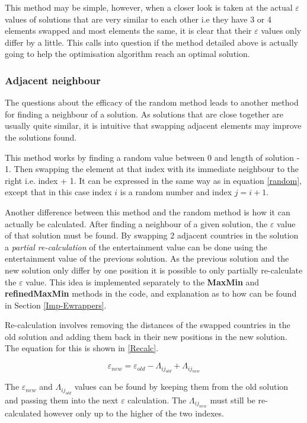 \documentclass[12pt]{report}
\begin{document}
This method may be simple, however, when a closer look is taken at the actual $\varepsilon$ values of solutions that are very similar to each other i.e they have 3 or 4 elements swapped and most elements the same, it is clear that their $\varepsilon$ values only differ by a little. This calls into question if the method detailed above is actually going to help the optimisation algorithm reach an optimal solution.

\subsubsection{Adjacent neighbour}
The questions about the efficacy of the random method leads to another method for finding a neighbour of a solution. As solutions that are close together are usually quite similar, it is intuitive that swapping adjacent elements may improve the solutions found.

This method works by finding a random value between 0 and length of solution - 1. Then swapping the element at that index with its immediate neighbour to the right i.e. index + 1. It can be expressed in the same way as in equation \ref{random}, except that in this case index $i$ is a random number and index $j = i + 1$.

Another difference between this method and the random method is how it can actually be calculated. After finding a neighbour of a given solution, the $\varepsilon$ value of that solution must be found. By swapping 2 adjacent countries in the solution a \textit{partial re-calculation} of the entertainment value can be done using the entertainment value of the previous solution. As the previous solution and the new solution only differ by one position it is possible to only partially re-calculate the $\varepsilon$ value. This idea is implemented separately to the \textbf{MaxMin} and \textbf{refinedMaxMin} methods in the code, and explanation as to how can be found in Section \ref{Imp-Ewrappers}.

Re-calculation involves removing the distances of the swapped countries in the old solution and adding them back in their new positions in the new solution. The equation for this is shown in \ref{Recalc}.

\begin{equation}\label{Recalc}
	\varepsilon_{new} = \varepsilon_{old} - \Lambda_{ij_{old}} + \Lambda_{ij_{new}}
\end{equation}

The $\varepsilon_{new}$ and $\Lambda_{ij_{old}}$ values can be found by keeping them from the old solution and passing them into the next $\varepsilon$ calculation. The $\Lambda_{ij_{new}}$ must still be re-calculated however only up to the higher of the two indexes.
\end{document}
